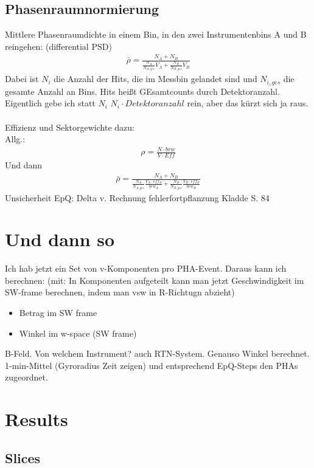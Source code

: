 %
\subsection{Phasenraumnormierung}
Mittlere Phasenraumdichte in einem Bin, in den zwei Instrumentenbins A und B reingehen:
(differential PSD)
\begin{align}
\bar{\rho} = \frac{N_A + N_B}{\frac{N_A}{N_{A,ges}} V_A + \frac{N_B}{N_{B,ges}} V_B }
\end{align}
Dabei ist $N_i$ die Anzahl der Hits, die im Messbin gelandet sind und $N_{i,ges}$ die gesamte Anzahl an Bins. Hits heißt GEsamtcounts durch Detektoranzahl. Eigentlich gebe ich statt $N_i$ $N_i \cdot Detektoranzahl$ rein, aber das kürzt sich ja raus.\\ \\
Effizienz und Sektorgewichte dazu:\\
Allg.:
\begin{align*}
\rho = \frac{N \cdot brw}{V \cdot Eff}
\end{align*}
Und dann
\begin{align}
\bar{\rho} = \frac{N_A + N_B}{\frac{N_A}{N_{A,ges}} \frac{V_A \cdot eff_A}{brw_A} + \frac{N_B}{N_{B,ges}} \frac{V_B \cdot eff_B}{brw_B} }
\end{align}
Unsicherheit EpQ: Delta v. Rechnung fehlerfortpflanzung Kladde S. 84


%
%
%
\section{Und dann so}
Ich hab jetzt ein Set von v-Komponenten pro PHA-Event. Daraus kann ich berechnen:
(mit: In Komponenten aufgeteilt kann man jetzt Geschwindigkeit im SW-frame berechnen, indem man vsw in R-Richtugn abzieht)
\begin{itemize}
	\item Betrag im SW frame
	\item Winkel im w-space (SW frame)
\end{itemize}
B-Feld. Von welchem Instrument? auch RTN-System. Genauso Winkel berechnet.\\
1-min-Mittel (Gyroradius Zeit zeigen) und entsprechend EpQ-Steps den PHAs zugeordnet.


%
%
%
\section{Results}
\subsection{Slices}
